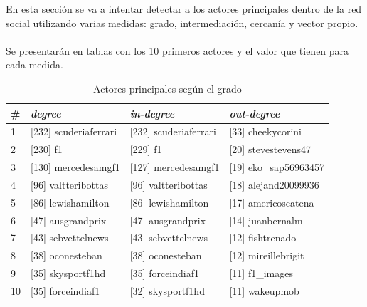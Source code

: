 En esta sección se va a intentar detectar a los actores principales dentro de la red social utilizando varias medidas: grado, intermediación, cercanía y vector propio.
\\ \\
Se presentarán en tablas con los 10 primeros actores y el valor que tienen para cada medida.

\begin{table}[H]
	\centering
	\caption{Actores principales según el grado}
	\label{tab:actores-principales-grado}
	\begin{tabular}{| l | l l l |}
		\hline
		\# & \textit{degree}       & \textit{in-degree}     & \textit{out-degree}   \\
		\hline
		1  & [232] scuderiaferrari & [232] scuderiaferrari  & [33] cheekycorini     \\
		2  & [230] f1              & [229] f1               & [20] stevestevens47   \\
		3  & [130] mercedesamgf1   & [127] mercedesamgf1    & [19] eko\_sap56963457 \\
		4  & [96] valtteribottas   & [96] valtteribottas    & [18] alejand20099936  \\
		5  & [86] lewishamilton    & [86] lewishamilton     & [17] americoscatena   \\
		6  & [47] ausgrandprix     & [47] ausgrandprix      & [14] juanbernalm      \\
		7  & [43] sebvettelnews    & [43] sebvettelnews     & [12] fishtrenado      \\
		8  & [38] oconesteban      & [38] oconesteban       & [12] mireillebrigit   \\
		9  & [35] skysportf1hd     & [35] forceindiaf1      & [11] f1\_images       \\
		10 & [35] forceindiaf1     & [32] skysportf1hd      & [11] wakeupmob        \\
		\hline
	\end{tabular}
\end{table}

